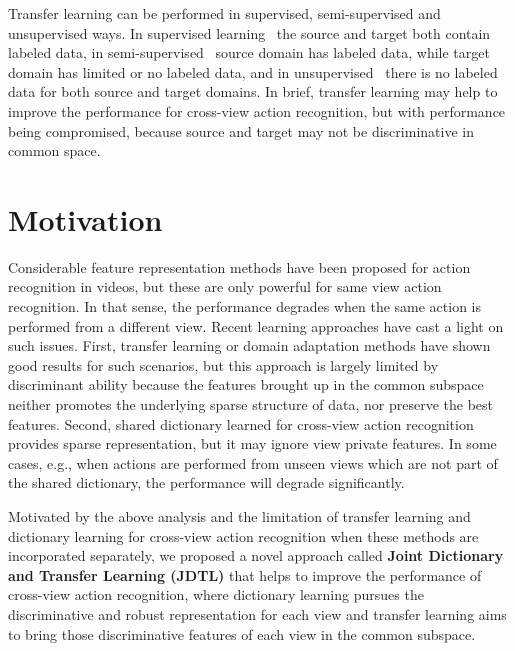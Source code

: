  Transfer learning can be performed in supervised, semi-supervised and unsupervised ways. In supervised learning~\cite{daume2009frustratingly, chattopadhyay2012multisource} the source and target both contain labeled data, in semi-supervised~\cite{chattopadhyay2012multisource,blitzer2006domain1} source domain has labeled data, while target domain has limited or no labeled data, and in unsupervised~\cite{cook2013transfer} there is no labeled data for both source and target domains. In brief, transfer learning may help to improve the performance for cross-view action recognition, but with performance being compromised, because source and target may not be discriminative in common space.   

\section{Motivation}
Considerable feature representation methods have been proposed for action recognition in videos, but these are only powerful for same view action recognition. In that sense, the performance degrades when the same action is performed from a different view. Recent learning approaches have cast a light on such issues. First, transfer learning or domain adaptation methods have shown good results for such scenarios, but this approach is largely limited by discriminant ability because the features brought up in the common subspace neither promotes the underlying sparse structure of data, nor preserve the best features. Second, shared dictionary learned for cross-view action recognition provides sparse representation, but it may ignore view private features. In some cases, e.g., when actions are performed from unseen views which are not part of the shared dictionary, the performance will degrade significantly.

Motivated by the above analysis and the limitation of transfer learning and dictionary learning for cross-view action recognition when these methods are incorporated separately, we proposed a novel approach called \textbf{Joint Dictionary and Transfer Learning (JDTL)} that helps to improve the performance of cross-view action recognition, where dictionary learning pursues the discriminative and robust representation for each view and transfer learning aims to bring those discriminative features of each view in the common subspace.
\newpage
